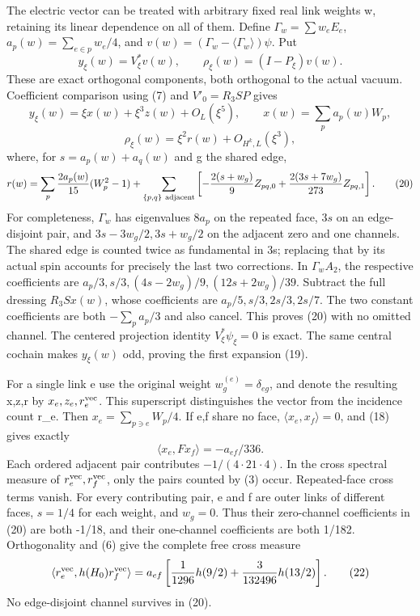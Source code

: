\documentclass[
  11pt,
]{article}
\begin{document}
The electric vector can be treated with arbitrary fixed real link
weights w, retaining its linear dependence on all of them. Define
\(\Gamma_w=\sum w_eE_e\), \(a_p(w)=\sum_{e\in p}w_e/4\), and
\(v(w)=(\Gamma_w-\langle\Gamma_w\rangle)\psi\). Put \[
 y_\xi(w)=V_\xi^*v(w),\qquad
 \rho_\xi(w)=(I-P_\xi)v(w).
\] These are exact orthogonal components, both orthogonal to the actual
vacuum. Coefficient comparison using (7) and \(V'_0=R_3SP\) gives \[
 y_\xi(w)=\xi x(w)+\xi^3z(w)+O_L(\xi^5),\qquad
 x(w)=\sum_pa_p(w)W_p,
\] \[
 \rho_\xi(w)=\xi^2r(w)+O_{H^k,L}(\xi^3),
\tag{19}
\] where, for \(s=a_p(w)+a_q(w)\) and g the shared edge, \[
 r(w)=\sum_p\frac{2a_p(w)}{15}(W_p^2-1)
       +\sum_{\{p,q\}\ {\rm adjacent}}
       \left[-\frac{2(s+w_g)}9Z_{pq,0}
             +\frac{2(3s+7w_g)}{273}Z_{pq,1}\right].
\tag{20}
\] For completeness, \(\Gamma_w\) has eigenvalues \(8a_p\) on the
repeated face, \(3s\) on an edge-disjoint pair, and
\(3s-3w_g/2,3s+w_g/2\) on the adjacent zero and one channels. The shared
edge is counted twice as fundamental in 3s; replacing that by its actual
spin accounts for precisely the last two corrections. In
\(\Gamma_w A_2\), the respective coefficients are
\(a_p/3,s/3,(4s-2w_g)/9,(12s+2w_g)/39\). Subtract the full dressing
\(R_3Sx(w)\), whose coefficients are \(a_p/5,s/3,2s/3,2s/7\). The two
constant coefficients are both \(-\sum_pa_p/3\) and also cancel. This
proves (20) with no omitted channel. The centered projection identity
\(V_\xi^*\psi_\xi=0\) is exact. The same central cochain makes
\(y_\xi(w)\) odd, proving the first expansion (19).

For a single link e use the original weight \(w^{(e)}_g=\delta_{eg}\),
and denote the resulting x,z,r by \(x_e,z_e,r_e^{\rm vec}\). This
superscript distinguishes the vector from the incidence count r\_e. Then
\(x_e=\sum_{p\ni e}W_p/4\). If e,f share no face,
\(\langle x_e,x_f\rangle=0\), and (18) gives exactly \[
 \langle x_e,Fx_f\rangle=-a_{ef}/336.
\tag{21}
\] Each ordered adjacent pair contributes \(-1/(4\cdot21\cdot4)\). In
the cross spectral measure of \(r_e^{\rm vec},r_f^{\rm vec}\), only the
pairs counted by (3) occur. Repeated-face cross terms vanish. For every
contributing pair, e and f are outer links of different faces, \(s=1/4\)
for each weight, and \(w_g=0\). Thus their zero-channel coefficients in
(20) are both -1/18, and their one-channel coefficients are both 1/182.
Orthogonality and (6) give the complete free cross measure \[
 \langle r_e^{\rm vec},h(H_0)r_f^{\rm vec}\rangle
 =a_{ef}\left[\frac1{1296}h(9/2)+\frac3{132496}h(13/2)\right].
\tag{22}
\] No edge-disjoint channel survives in (20).
\end{document}
